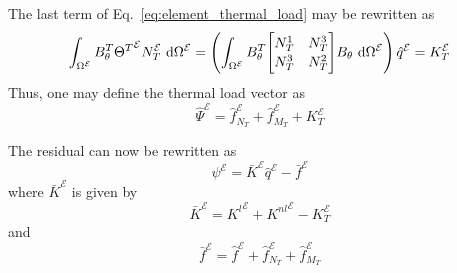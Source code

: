 \documentclass[12pt]{article}
\numberwithin{equation}{section}
\def\el{{ \mathcal{E} }}
\begin{document}
% 
The last term of Eq.~\eqref{eq:element_thermal_load} may be rewritten as
% 
\begin{equation}
    \int_{\Omega^\el} B_\theta^T {\Theta^T}^\el  N_T^\el ~ \text{d}\Omega^\el
    =
    \left(
    \int_{\Omega^\el}
    B_\theta^T
    {\renewcommand\arraystretch{1.15}
        \begin{bmatrix}
            N_T^1 & N_T^3 \\
            N_T^3 & N_T^2
        \end{bmatrix}
    }
    B_\theta ~ \text{d}\Omega^\el
    \right) \hat{q}^\el
    = K_T^\el
\end{equation}
% 
Thus, one may define the thermal load vector as
% 
\begin{equation}
    \hat{\Psi}^\el = \hat{f}^\el_{{N}_T} + \hat{f}^\el_{{M}_T} + K_T^\el
\end{equation}

The residual can now be rewritten as
% 
\begin{equation}
    \psi^\el = \bar{K}^\el \hat{q}^\el - \bar{f}^\el
    \label{eq:residual_2}
\end{equation}
% 
where \(\bar{K}^\el\) is given by
% 
\begin{equation}
    \bar{K}^\el = {K^l}^\el + {K^{nl}}^\el - K_T^\el
\end{equation}
% 
and
% 
\begin{equation}
    \bar{f}^\el =
    \hat{f}^\el +
    \hat{f}^\el_{{N}_T} +
    \hat{f}^\el_{{M}_T}
\end{equation}
\end{document}
